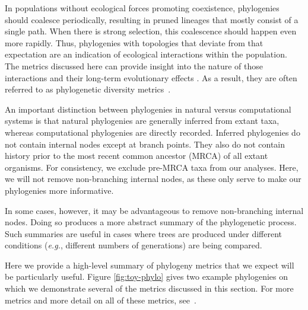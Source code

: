 \documentclass[letterpaper]{article}
\begin{document}
In populations without ecological forces promoting coexistence, phylogenies should coalesce periodically, resulting in pruned lineages that mostly consist of a single path. When there is strong selection, this coalescence should happen even more rapidly. Thus, phylogenies with topologies that deviate from that expectation are an indication of ecological interactions within the population. The metrics discussed here can provide insight into the nature of those interactions and their long-term evolutionary effects \citep{dolson_ecological_2018-1}. As a result, they are often referred to as phylogenetic diversity metrics~\citep{tucker_guide_2017}.

An important distinction between phylogenies in natural versus computational systems is that natural phylogenies are generally inferred from extant taxa, whereas computational phylogenies are directly recorded. Inferred phylogenies do not contain internal nodes except at branch points. They also do not contain history prior to the most recent common ancestor (MRCA) of all extant organisms. For consistency, we exclude pre-MRCA taxa from our analyses. Here, we will not remove non-branching internal nodes, as these only serve to make our phylogenies more informative. 

In some cases, however, it may be advantageous to remove non-branching internal nodes. Doing so produces a more abstract summary of the phylogenetic process. Such summaries are useful in cases where trees are produced under different conditions (\textit{e.g.}, different numbers of generations) are being compared.

Here we provide a high-level summary of phylogeny metrics that we expect will be particularly useful.
Figure \ref{fig:toy-phylo} gives two example phylogenies on which we demonstrate several of the metrics discussed in this section.
For more metrics and more detail on all of these metrics, see~\citep{winter_phylogenetic_2013, tucker_guide_2017}. 
\end{document}
